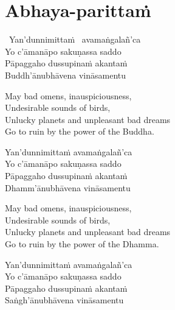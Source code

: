 \suttaRef{[Thai]}

\section{Abhaya-parittaṁ}
\label{abhaya-parittam}

\begin{pali-hangtogether}
  \anglebracketleft\ \hspace{-0.5mm}Yan'dunnimittaṁ \hspace{-0.5mm}\anglebracketright\ avamaṅgalañ'ca\\
  Yo c'āmanāpo sakuṇassa saddo\\
  Pāpaggaho dussupinaṁ akantaṁ\\
  Buddh'ānubhāvena vināsamentu
\end{pali-hangtogether}

\begin{english-verses}
  May bad omens, inauspiciousness,\\
  Undesirable sounds of birds,\\
  Unlucky planets and unpleasant bad dreams\\
  Go to ruin by the power of the Buddha.
\end{english-verses}

\begin{pali-hang-continued}
  Yan'dunnimittaṁ avamaṅgalañ'ca\\
  Yo c'āmanāpo sakuṇassa saddo\\
  Pāpaggaho dussupinaṁ akantaṁ\\
  Dhamm'ānubhāvena vināsamentu
\end{pali-hang-continued}

\begin{english-verses}
  May bad omens, inauspiciousness,\\
  Undesirable sounds of birds,\\
  Unlucky planets and unpleasant bad dreams\\
  Go to ruin by the power of the Dhamma.
\end{english-verses}

\begin{pali-hang-continued}
  Yan'dunnimittaṁ avamaṅgalañ'ca\\
  Yo c'āmanāpo sakuṇassa saddo\\
  Pāpaggaho dussupinaṁ akantaṁ\\
  Saṅgh'ānubhāvena vināsamentu
\end{pali-hang-continued}

